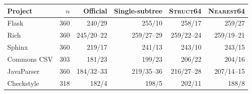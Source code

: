 \begin{tabular}{lrrrrr}
\toprule
Project & $n$ & Official & Single-subtree & \textsc{Struct64} & \textsc{Nearest64} \\
\midrule
Flask & 360 & 240/29 & 255/10 & 258/17 & 259/27 \\
Rich & 360 & 245/20--22 & 259/27--29 & 259/22--24 & 259/19--21 \\
Sphinx & 360 & 219/17 & 241/13 & 243/10 & 243/15 \\
Commons CSV & 303 & 181/23 & 199/23 & 206/22 & 204/16 \\
JavaParser & 360 & 184/32--33 & 219/35--36 & 216/27--28 & 207/14--15 \\
Checkstyle & 318 & 182/4 & 198/5 & 202/11 & 188/8 \\
\bottomrule
\end{tabular}
